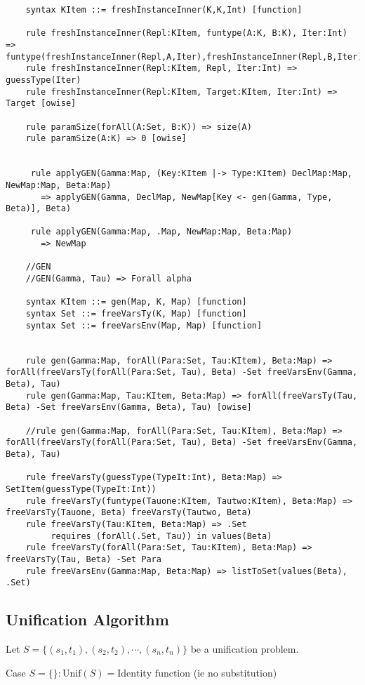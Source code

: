 \begin{lstlisting}
    syntax KItem ::= freshInstanceInner(K,K,Int) [function]

    rule freshInstanceInner(Repl:KItem, funtype(A:K, B:K), Iter:Int) => funtype(freshInstanceInner(Repl,A,Iter),freshInstanceInner(Repl,B,Iter))
    rule freshInstanceInner(Repl:KItem, Repl, Iter:Int) => guessType(Iter)
    rule freshInstanceInner(Repl:KItem, Target:KItem, Iter:Int) => Target [owise]

    rule paramSize(forAll(A:Set, B:K)) => size(A)
    rule paramSize(A:K) => 0 [owise]


     rule applyGEN(Gamma:Map, (Key:KItem |-> Type:KItem) DeclMap:Map, NewMap:Map, Beta:Map)
       => applyGEN(Gamma, DeclMap, NewMap[Key <- gen(Gamma, Type, Beta)], Beta)

     rule applyGEN(Gamma:Map, .Map, NewMap:Map, Beta:Map)
       => NewMap

    //GEN
    //GEN(Gamma, Tau) => Forall alpha

    syntax KItem ::= gen(Map, K, Map) [function]
    syntax Set ::= freeVarsTy(K, Map) [function]
    syntax Set ::= freeVarsEnv(Map, Map) [function]


    rule gen(Gamma:Map, forAll(Para:Set, Tau:KItem), Beta:Map) => forAll(freeVarsTy(forAll(Para:Set, Tau), Beta) -Set freeVarsEnv(Gamma, Beta), Tau)
    rule gen(Gamma:Map, Tau:KItem, Beta:Map) => forAll(freeVarsTy(Tau, Beta) -Set freeVarsEnv(Gamma, Beta), Tau) [owise]

    //rule gen(Gamma:Map, forAll(Para:Set, Tau:KItem), Beta:Map) => forAll(freeVarsTy(forAll(Para:Set, Tau), Beta) -Set freeVarsEnv(Gamma, Beta), Tau)

    rule freeVarsTy(guessType(TypeIt:Int), Beta:Map) => SetItem(guessType(TypeIt:Int))
    rule freeVarsTy(funtype(Tauone:KItem, Tautwo:KItem), Beta:Map) => freeVarsTy(Tauone, Beta) freeVarsTy(Tautwo, Beta)
    rule freeVarsTy(Tau:KItem, Beta:Map) => .Set
         requires (forAll(.Set, Tau)) in values(Beta)
    rule freeVarsTy(forAll(Para:Set, Tau:KItem), Beta:Map) => freeVarsTy(Tau, Beta) -Set Para
    rule freeVarsEnv(Gamma:Map, Beta:Map) => listToSet(values(Beta), .Set)
\end{lstlisting}
\subsection{Unification Algorithm}

Let $S = \{(s_1 , t_1), (s_2 , t_2), \cdots, (s_n , t_n)\}$ be a
unification problem.

Case $S = \{ \} : \text{Unif}(S) = \text{Identity function}$ (ie
no substitution)

